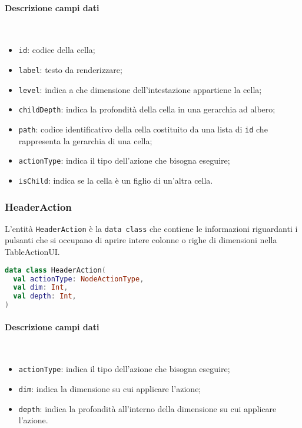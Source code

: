 \paragraph{Descrizione campi dati} \mbox{} \\
\begin{itemize}
	\item \verb|id|: codice della cella;
	\item \verb|label|: testo da renderizzare;
	\item \verb|level|: indica a che dimensione dell'intestazione appartiene la cella;
	\item \verb|childDepth|: indica la profondità della cella in una gerarchia ad albero;
	\item \verb|path|: codice identificativo della cella costituito da una lista di \verb|id| che rappresenta la gerarchia di una cella;
	\item \verb|actionType|: indica il tipo dell'azione che bisogna eseguire;
	\item \verb|isChild|: indica se la cella è un figlio di un'altra cella.
\end{itemize}

\subsubsection{HeaderAction}
L'entità \verb|HeaderAction| è la \verb|data class| che contiene le informazioni riguardanti i pulsanti che si occupano di aprire intere colonne o righe di dimensioni nella TableActionUI.
\begin{lstlisting}[caption={HeaderAction}, label={lst:headeraction}, language=Kotlin]
data class HeaderAction(
  val actionType: NodeActionType,
  val dim: Int,
  val depth: Int,
)
\end{lstlisting}
\paragraph{Descrizione campi dati} \mbox{} \\
\begin{itemize}
	\item \verb|actionType|:  indica il tipo dell'azione che bisogna eseguire;
	\item \verb|dim|: indica la dimensione su cui applicare l'azione;
	\item \verb|depth|: indica la profondità all'interno della dimensione su cui applicare l'azione.
\end{itemize}

